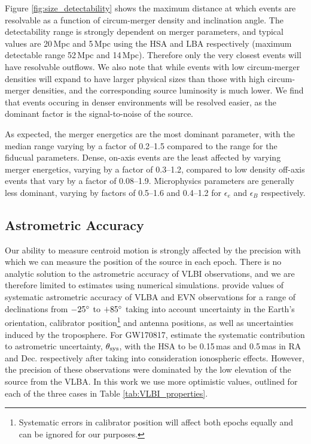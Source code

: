 Figure \ref{fig:size_detectability} shows the maximum distance at which events are resolvable as a function of circum-merger density and inclination angle. The detectability range is strongly dependent on merger parameters, and typical values are 20\,Mpc and 5\,Mpc using the HSA and LBA respectively (maximum detectable range 52\,Mpc and 14\,Mpc). Therefore only the very closest events will have resolvable outflows. We also note that while events with low circum-merger densities will expand to have larger physical sizes than those with high circum-merger densities, and the corresponding source luminosity is much lower. We find that events occuring in denser environments will be resolved easier, as the dominant factor is the signal-to-noise of the source.

As expected, the merger energetics are the most dominant parameter, with the median range varying by a factor of 0.2--1.5 compared to the range for the fiducual parameters. Dense, on-axis events are the least affected by varying merger energetics, varying by a factor of 0.3--1.2, compared to low density off-axis events that vary by a factor of 0.08--1.9. Microphysics parameters are generally less dominant, varying by factors of 0.5--1.6 and 0.4--1.2 for $\epsilon_e$ and $\epsilon_B$ respectively.





\subsection{Astrometric Accuracy}
Our ability to measure centroid motion is strongly affected by the precision with which we can measure the position of the source in each epoch. There is no analytic solution to the astrometric accuracy of VLBI observations, and we are therefore limited to estimates using numerical simulations. \citet{2006A&A...452.1099P} provide values of systematic astrometric accuracy of VLBA and EVN observations for a range of declinations from $-25\mbox{$^\circ$}$ to $+85\mbox{$^\circ$}$ taking into account uncertainty in the Earth's orientation, calibrator position\footnote{Systematic errors in calibrator position will affect both epochs equally and can be ignored for our purposes.} and antenna positions, as well as uncertainties induced by the troposphere. For GW170817, \citet{2018Natur.561..355M} estimate the systematic contribution to astrometric uncertainty, $\theta_{\rm sys}$, with the HSA to be 0.15\,mas and 0.5\,mas in RA and Dec. respectively after taking into consideration ionospheric effects. However, the precision of these observations were dominated by the low elevation of the source from the VLBA. In this work we use more optimistic values, outlined for each of the three cases in Table \ref{tab:VLBI_properties}.

